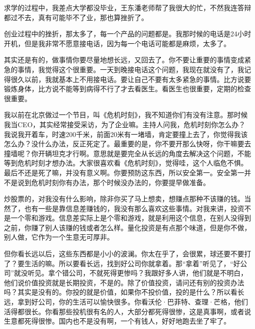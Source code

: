 求学的过程中，我差点大学都没毕业，王东潘老师帮了我很大的忙，不然我连答辩都过不去，真有可能毕不了业，那也算挫折了。

创业过程中的挫折，那太多了，每一个产品的问题都是。我那时候的电话是24小时开机，但是我非常不愿意接电话，因为每一个电话可能都是麻烦，太多了。


其实还是有的，做事情你要尽量地想长远，又回去了。你不要让重要的事情变成紧急的事情，我觉得这个很重要。一天到晚接电话这个问题，我现在就没有了，我记得很久以前，我就基本上不用接电话。要让自己不要有太多紧急的事情。比方说要锻炼身体，比方说不能等到病得不行了才去看医生。看医生也很重要，定期的检查很重要。

我以前在北京做过一个节目，叫《危机时刻》，我不知道你们有没有注意。那时候我当CEO，其实经常接受采访，为了企业嘛。主持人问我，危机时刻你怎么办？我说我开着车，时速200千米，前面20米有一堵墙，肯定要撞上去了，你觉得我该怎么办？没什么办法，反正死定了。最重要的是，你不要开那么快呀，你干嘛要去撞墙呢？你开辆坦克才行啊。意思就是要完全从长远的角度去解决这个问题，不能等到危机时刻才想办法。大家很喜欢看《危机时刻》，觉得哇，这个人临危不惧。最后不还是死了嘛，并没有意义啊。你要预防这东西，所以安全第一。安全第一并不是说到危机时刻你有办法，那个时候没办法的，你要提早做准备。



炒股票的，对我没有什么影响，除非你买了马上想卖，想赚点那种不该赚的钱。当然了，也有一些是靠信息差赚钱的，我没有那么喜欢这些事情。对我来讲，投资不是一个零和游戏。信息差实际上是个零和游戏，就是利用这个信息，在别人没得到之前，你赚了别人该赚的钱或者怎么样。量化投资是有点那个味道，但是你不做，别人做，它作为一个生意无可厚非。

但你看长远以后，这些东西都是小小的波澜。你太在乎了，会很累，球还要不要打了？要生活的嘛。所以要看长远，找到好公司你就拿着。那“拿着”听见了，“好公司”就没听见。拿个错公司，不就死得更惨吗？我跟好多人讲，他们就是不明白，他们说价值投资就是长期投资，不是的。除了价值投资，请问还有别的投资办法吗？其实是没有的。你投的就是价值，如果你不投价值，投的是什么？所以看长远，拿到好公司，你的生活可以愉快很多。你看沃伦·巴菲特、查理·芒格，他们活得都很长。你看那些投机很有名的人，大部分都死得很惨，这是真事啊，或者说生意都死得很惨。国内也不是没有啊，一个有钱人，好好地跑去坐了牢了。


